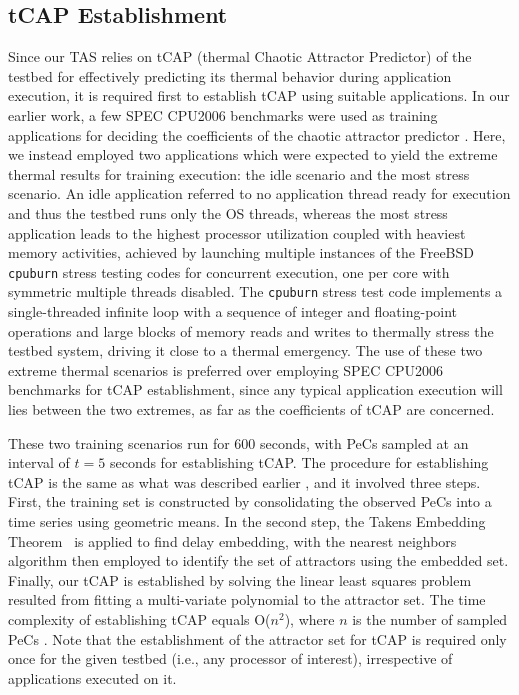 \documentclass[times, 10pt,twocolumn]{IEEEtran}
\begin{document}
\subsection{tCAP Establishment}
\label{sec:callibration}
Since our TAS relies on tCAP (thermal Chaotic Attractor Predictor) of
the testbed for effectively predicting its thermal behavior during
application execution, it is required first to establish tCAP using
suitable applications.  In our earlier work, a few SPEC CPU2006
benchmarks were used as training applications for deciding the
coefficients of the chaotic attractor predictor \cite{Lewis2010}.  Here,
we instead employed two applications which were expected to yield the
extreme thermal results for training execution: the idle scenario and
the most stress scenario.  An idle application referred to no
application thread ready for execution and thus the testbed runs only
the OS threads, whereas the most stress application leads to the highest
processor utilization coupled with heaviest memory activities, achieved
by launching multiple instances of the FreeBSD \texttt{cpuburn} stress
testing codes for concurrent execution, one per core with symmetric
multiple threads disabled.  The \texttt{cpuburn} stress test code
implements a single-threaded infinite loop with a sequence of integer
and floating-point operations and large blocks of memory reads and
writes to thermally stress the testbed system, driving it close to a
thermal emergency.  The use of these two extreme thermal scenarios is
preferred over employing SPEC CPU2006 benchmarks for tCAP establishment,
since any typical application execution will lies between the two
extremes, as far as the coefficients of tCAP are concerned.

These two training scenarios run for 600 seconds, with PeCs sampled at
an interval of $t=5$ seconds for establishing tCAP.  The procedure for
establishing tCAP is the same as what was described earlier
\cite{Lewis2010}, and it involved three steps. First, the training set
is constructed by consolidating the observed PeCs into a time series
using geometric means.  In the second step, the Takens
Embedding Theorem~\cite{Su2010} is applied to find delay embedding,
with the nearest neighbors algorithm then employed to identify the 
set of attractors using the embedded set.
Finally, our tCAP is established by solving the linear least
squares problem resulted from fitting a multi-variate polynomial to
the attractor set.
The time complexity of establishing tCAP equals O($n ^2$),
where $n$ is the number of sampled PeCs \cite{Lewis2010}.
Note that the establishment of the attractor set for tCAP is required
only once for the given testbed (i.e., any processor of interest),
irrespective of applications executed on it.
\end{document}
